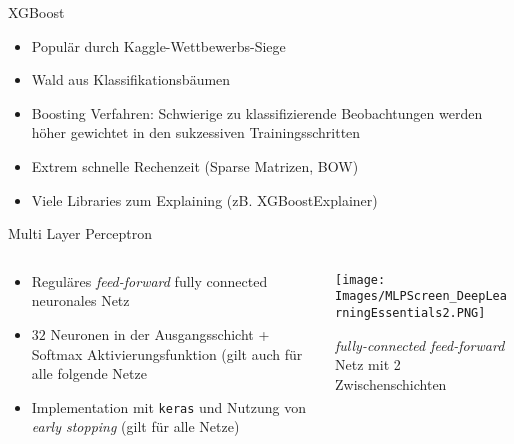 \documentclass[8pt, xcolor = dvipsnames]{beamer}
\begin{document}
\begin{frame}{XGBoost}
    \begin{itemize}
    \item Populär durch Kaggle-Wettbewerbs-Siege
        \item Wald aus Klassifikationsbäumen
        \item Boosting Verfahren: Schwierige zu klassifizierende Beobachtungen werden höher gewichtet in den sukzessiven Trainingsschritten
        \item Extrem schnelle Rechenzeit (Sparse Matrizen, BOW)
        \item Viele Libraries zum Explaining (zB. XGBoostExplainer)
    \end{itemize}{}
\end{frame}{}





\begin{frame}{Multi Layer Perceptron}
\begin{columns}[T] %
\begin{column}{.48\textwidth}

\begin{itemize}
    \item Reguläres \textit{feed-forward} fully connected neuronales Netz
    \item $32$ Neuronen in der Ausgangsschicht + Softmax Aktivierungsfunktion (gilt auch für alle folgende Netze
    \item Implementation mit \texttt{keras} und Nutzung von \textit{early stopping} (gilt für alle Netze)
\end{itemize}{}

\end{column}%
\hfill%
\begin{column}{.48\textwidth}

\centering
\texttt{[image: Images/MLPScreen\_DeepLearningEssentials2.PNG]}
\caption{\textit{fully-connected feed-forward} Netz mit 2 Zwischenschichten}

\end{column}%
\end{columns}

\end{frame}{}
\end{document}

